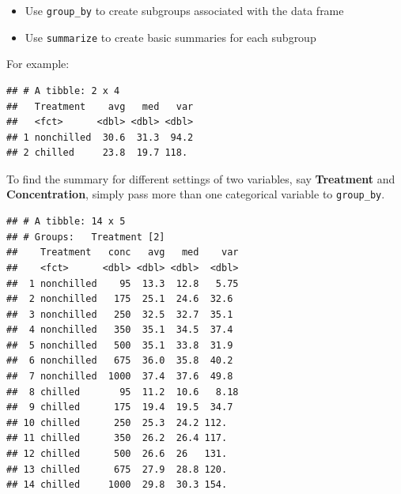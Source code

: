 \documentclass[
]{book}
\newenvironment{Shaded}{\begin{snugshade}}{\end{snugshade}}
\newcommand{\DataTypeTok}[1]{\textcolor[rgb]{0.13,0.29,0.53}{#1}}
\newcommand{\KeywordTok}[1]{\textcolor[rgb]{0.13,0.29,0.53}{\textbf{#1}}}
\newcommand{\NormalTok}[1]{#1}
\newcommand{\OperatorTok}[1]{\textcolor[rgb]{0.81,0.36,0.00}{\textbf{#1}}}
\newcommand{\StringTok}[1]{\textcolor[rgb]{0.31,0.60,0.02}{#1}}
\providecommand{\tightlist}{%
  \setlength{\itemsep}{0pt}\setlength{\parskip}{0pt}}
\theoremstyle{definition}
\theoremstyle{definition}
\theoremstyle{definition}
\theoremstyle{remark}
\begin{document}
\begin{itemize}
\tightlist
\item
  Use \texttt{group\_by} to create subgroups associated with the data frame\\
\item
  Use \texttt{summarize} to create basic summaries for each subgroup
\end{itemize}

For example:

\begin{Shaded}
\end{Shaded}

\begin{verbatim}
## # A tibble: 2 x 4
##   Treatment    avg   med   var
##   <fct>      <dbl> <dbl> <dbl>
## 1 nonchilled  30.6  31.3  94.2
## 2 chilled     23.8  19.7 118.
\end{verbatim}

To find the summary for different settings of two variables, say \textbf{Treatment} and \textbf{Concentration}, simply pass more than one categorical variable to \texttt{group\_by}.

\begin{Shaded}
\end{Shaded}

\begin{verbatim}
## # A tibble: 14 x 5
## # Groups:   Treatment [2]
##    Treatment   conc   avg   med    var
##    <fct>      <dbl> <dbl> <dbl>  <dbl>
##  1 nonchilled    95  13.3  12.8   5.75
##  2 nonchilled   175  25.1  24.6  32.6 
##  3 nonchilled   250  32.5  32.7  35.1 
##  4 nonchilled   350  35.1  34.5  37.4 
##  5 nonchilled   500  35.1  33.8  31.9 
##  6 nonchilled   675  36.0  35.8  40.2 
##  7 nonchilled  1000  37.4  37.6  49.8 
##  8 chilled       95  11.2  10.6   8.18
##  9 chilled      175  19.4  19.5  34.7 
## 10 chilled      250  25.3  24.2 112.  
## 11 chilled      350  26.2  26.4 117.  
## 12 chilled      500  26.6  26   131.  
## 13 chilled      675  27.9  28.8 120.  
## 14 chilled     1000  29.8  30.3 154.
\end{verbatim}
\end{document}
